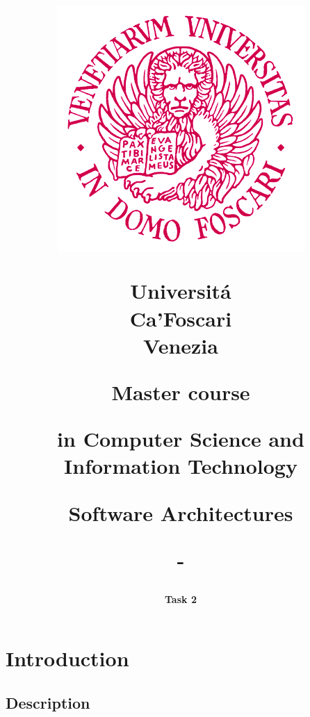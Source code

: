 \documentclass[a4paper,11pt]{report}
\title{
	\begin{figure}[!h]
		\vspace{-65mm}  
		\hspace{-30mm}
		\includegraphics[width=0.2\linewidth]{img/logo.jpg} \newline
		\hspace{-30mm}
		\label{fig:logo}
	\end{figure}
	\begin{flushleft}
		\vspace{-11mm}  
		\hspace{-30mm}
		\fontfamily{roboto}\selectfont Universit\'{a} \\
		\hspace{-30mm}
		Ca'Foscari\\
		\hspace{-30mm}
		Venezia\\
	\end{flushleft}
	\vspace{25mm}  
	\centerline{Master course}
	\vspace{5mm}
	\centerline{in Computer Science and Information Technology}
	\vspace{30mm}
	\centerline{Software Architectures}
	\vspace{5mm}
	\centerline{-}
}
\author{
	\LARGE \textbf{Task 2} \newline
}
\date{
	\begin{flushleft}
		\vspace{30mm}
		\hspace*{-25mm}
		\textbf{Group 5} \newline
		\hspace*{-25mm}
		Bastianello Lorenzo, 874268\newline
		\hspace*{-25mm} 
		Bonomi Silvia, 867138\newline
		\hspace*{-25mm} 
		Bruno Francesco, 875812\newline
		\hspace*{-25mm} 
		Quaglia Beatrice Maria, 875332\newline
		\vspace{2mm} \newline
		\hspace*{-25mm}
		\textbf{Academic Year} \newline
		\hspace*{-25mm}
		2022 / 2023
	\end{flushleft}
}
\begin{document}
	\maketitle
	\makeatletter
	\chapter*{Introduction}
	\section*{Description}
	
\end{document}
